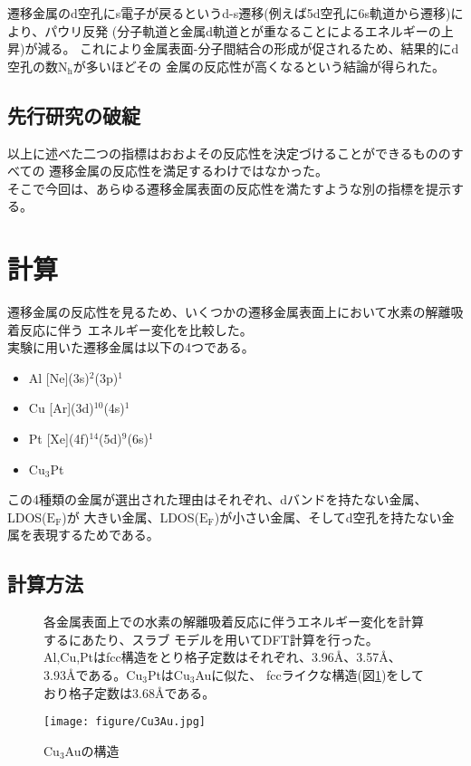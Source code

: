 \documentclass[12pt]{ltjsarticle}
\begin{document}
遷移金属のd空孔にs電子が戻るというd-s遷移(例えば5d空孔に6s軌道から遷移)により、パウリ反発
(分子軌道と金属d軌道とが重なることによるエネルギーの上昇)が減る。\cite{MORIKAWA2006}
これにより金属表面-分子間結合の形成が促されるため、結果的にd空孔の数$\text{N}_\text{h}$が多いほどその
金属の反応性が高くなるという結論が得られた。\cite{J.Harris1985}

\subsection{先行研究の破綻}
以上に述べた二つの指標はおおよその反応性を決定づけることができるもののすべての
遷移金属の反応性を満足するわけではなかった。\\
そこで今回は、あらゆる遷移金属表面の反応性を満たすような別の指標を提示する。\cite{Science1995}

\section{計算}
遷移金属の反応性を見るため、いくつかの遷移金属表面上において水素の解離吸着反応に伴う
エネルギー変化を比較した。\\
実験に用いた遷移金属は以下の4つである。

\begin{itemize}
 \item Al [Ne](3s)$^\text{2}$(3p)$^\text{1}$
 \item Cu [Ar](3d)$^\text{10}$(4s)$^\text{1}$
 \item Pt [Xe](4f)$^\text{14}$(5d)$^\text{9}$(6s)$^\text{1}$
 \item $\text{Cu}_\text{3}$Pt
\end{itemize}

この4種類の金属が選出された理由はそれぞれ、dバンドを持たない金属、LDOS($\text{E}_\text{F}$)が
大きい金属、LDOS($\text{E}_\text{F}$)が小さい金属、そしてd空孔を持たない金属を表現するためである。

\subsection{計算方法}

\begin{figure}[hbtp]
\begin{minipage}{.5\textwidth}
    各金属表面上での水素の解離吸着反応に伴うエネルギー変化を計算するにあたり、スラブ
    モデルを用いてDFT計算を行った。
    Al,Cu,Ptはfcc構造をとり格子定数はそれぞれ、3.96$\mbox{\AA}$、3.57$\mbox{\AA}$、
    3.93$\mbox{\AA}$である。$\text{Cu}_\text{3}$Ptは$\text{Cu}_\text{3}$Auに似た、
    fccライクな構造(図\ref{fig:Cu3Au})をしており格子定数は3.68$\mbox{\AA}$である。
\end{minipage}
\hfill
\begin{minipage}{.45\textwidth}
    \begin{center}
     \texttt{[image: figure/Cu3Au.jpg]}
    \end{center}
    \caption{Cu$_\text{3}$Auの構造}
    \label{fig:Cu3Au}
\end{minipage}
\end{figure}
\end{document}
